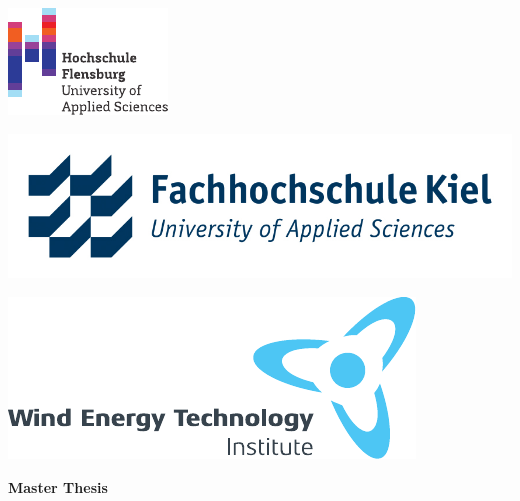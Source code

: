 \begin{titlepage}

\begin{minipage}[c]{0.25\textwidth}
\includegraphics[width=\textwidth]{Figures/00_other/FUAS.pdf}
\end{minipage}
\begin{minipage}[c]{0.35\textwidth}
\includegraphics[width=\textwidth]{Figures/00_other/FHKiel.jpg}
\end{minipage}
\begin{minipage}[c]{0.35\textwidth}
\includegraphics[width=\textwidth]{Figures/00_other/WETI.pdf}
\end{minipage}

\vspace{4cm}

\centering
{\bfseries\Large Master Thesis\\}


\end{titlepage}

